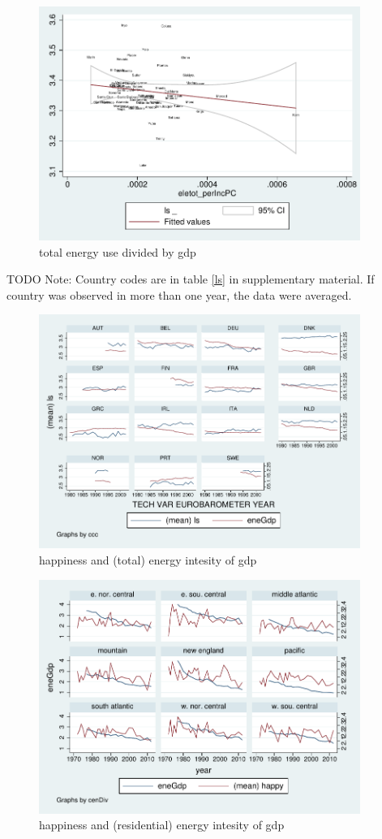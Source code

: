 \documentclass[10pt, letterpaper]{article}
\begin{document}
\begin{spacing}{1.4}
\begin{figure}[H]
 \includegraphics[height=3in]{graphsAndTables/caEleTotGdp.pdf}\centering
\caption{total energy use divided by gdp}\label{}
\end{figure}
{\scriptsize TODO Note: Country codes are in table \ref{ls} in supplementary
  material. If country was observed in more than one year, the data were averaged.}

\begin{figure}[H]
 \includegraphics[height=3in]{graphsAndTables/ebTSeneGdp.pdf}\centering
\caption{happiness and (total) energy intesity of gdp}\label{ebTSeneGdp}
\end{figure}

\begin{figure}[H]
 \includegraphics[height=3in]{graphsAndTables/cenDiveneGdp.pdf}\centering
\caption{happiness and (residential) energy intesity of gdp}\label{cenDiveneGdp}
\end{figure}


\end{spacing}
\end{document}
